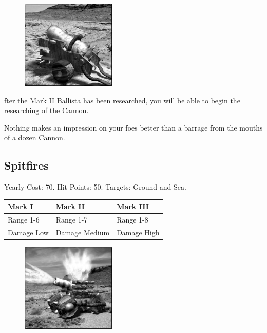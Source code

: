 \begin{figure}
	\vspace{-20pt}
	\begin{center}
		\includegraphics[width=0.4\textwidth]{Acannon}
	\end{center}
	\vspace{-50pt}
\end{figure}

fter the Mark II Ballista has been researched, you will be able to begin the researching of the Cannon.

Nothing makes an impression on your foes better than a barrage from the mouths of a dozen Cannon.

\subsection{Spitfires}



\begin{center}
	Yearly Cost: 70. Hit-Points: 50. Targets: Ground and Sea.
\end{center}

\begin{tabular}{ | p{1.3in} | p{1.3in} | p{1.3in} |}
	\hline
	\textbf{Mark I}	& \textbf{Mark II} & \textbf{Mark III} \\ \hline
	Range 1-6	& Range 1-7 & Range 1-8 \\ \hline
	Damage Low	& Damage Medium & Damage High \\ \hline
\end{tabular}

\begin{figure}
	\vspace{-20pt}
	\begin{center}
		\includegraphics[width=0.4\textwidth]{Aspitfire}
	\end{center}
\end{figure}

